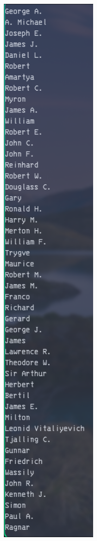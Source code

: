 \documentclass[
	12pt,				%
	oneside,			%
	a4paper,			%
	english,			%
	brazil,				%
	]{abntex2}
\begin{document}
{\begin{figure}[H]
    \centering
    \includegraphics[width=1\textwidth]{imgs/img2.png}
    \label{fig:img2}
\end{figure}

}
\end{document}
